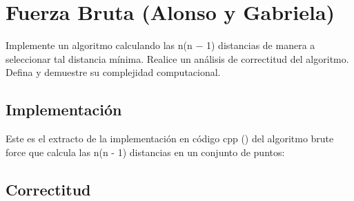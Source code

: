 \documentclass[main.tex]{subfiles}
\begin{document}
\section{Fuerza Bruta (Alonso y Gabriela)}

Implemente un algoritmo  calculando las n(n − 1) distancias de manera a
seleccionar tal distancia mínima. Realice un análisis de correctitud del algoritmo. Defina y
demuestre su complejidad computacional.


\subsection{Implementación}

Este es el extracto de la implementación en código cpp () del algoritmo brute
force que calcula las n(n - 1) distancias en un conjunto de puntos:
\vspace{1em}

\vspace{1em}

\subsection{Correctitud}
\end{document}

